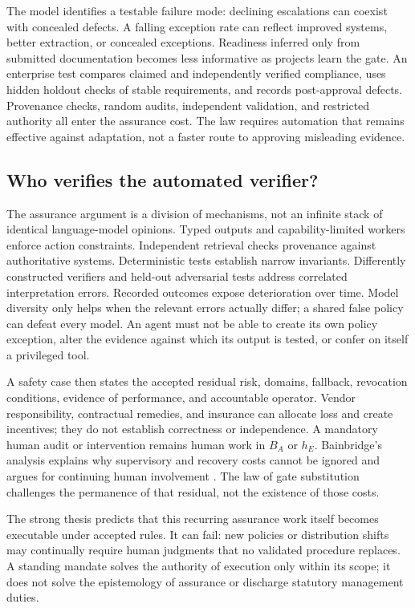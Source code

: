 The model identifies a testable failure mode: declining escalations can coexist with concealed defects.
A falling exception rate can reflect improved systems, better extraction, or concealed exceptions.
Readiness inferred only from submitted documentation becomes less informative as projects learn the
gate. An enterprise test compares claimed and independently verified compliance, uses hidden holdout
checks of stable requirements, and records post-approval defects. Provenance checks, random audits,
independent validation, and restricted authority all enter the assurance cost. The law requires
automation that remains effective against adaptation, not a faster route to approving misleading
evidence.

\subsection{Who verifies the automated verifier?}

The assurance argument is a division of mechanisms, not an infinite stack of identical language-model
opinions. Typed outputs and capability-limited workers enforce action constraints. Independent
retrieval checks provenance against authoritative systems. Deterministic tests establish narrow
invariants. Differently constructed verifiers and held-out adversarial tests address correlated
interpretation errors. Recorded outcomes expose deterioration over time. Model diversity only helps
when the relevant errors actually differ; a shared false policy can defeat every model. An agent must
not be able to create its own policy exception, alter the evidence against which its output is tested,
or confer on itself a privileged tool.

A safety case then states the accepted residual risk, domains, fallback, revocation conditions,
evidence of performance, and accountable operator. Vendor responsibility, contractual remedies, and
insurance can allocate loss and create incentives; they do not establish correctness or independence.
A mandatory human audit or intervention remains human work in $B_A$ or $h_E$. Bainbridge's analysis
explains why supervisory and recovery costs cannot be ignored and argues for continuing human
involvement \citep[pp.~775--777]{bainbridge1983}. The law of gate substitution challenges the permanence of that
residual, not the existence of those costs.

The strong thesis predicts that this recurring assurance work itself becomes executable under accepted
rules. It can fail: new policies or distribution shifts may continually require human judgments that
no validated procedure replaces. A standing mandate solves the authority of execution only within its
scope; it does not solve the epistemology of assurance or discharge statutory management duties.

